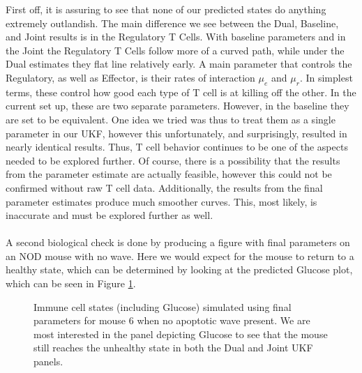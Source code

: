 \documentclass{article}
\begin{document}
First off, it is assuring to see that none of our predicted states do anything extremely outlandish. The main difference we see between the Dual, Baseline, and Joint results is in the Regulatory T Cells. With baseline parameters and in the Joint the Regulatory T Cells follow more of a curved path, while under the Dual estimates they flat line relatively early. A main parameter that controls the Regulatory, as well as Effector, is their rates of interaction $\mu_e$ and $\mu_r$. In simplest terms, these control how good each type of T cell is at killing off the other. In the current set up, these are two separate parameters. However, in the baseline they are set to be equivalent. One idea we tried was thus to treat them as a single parameter in our UKF, however this unfortunately, and surprisingly, resulted in nearly identical results. Thus, T cell behavior continues to be one of the aspects needed to be explored further. Of course, there is a possibility that the results from the parameter estimate are actually feasible, however this could not be confirmed without raw T cell data. Additionally, the results from the final parameter estimates produce much smoother curves. This, most likely, is inaccurate and must be explored further as well.\\
\\
A second biological check is done by producing a figure with final parameters on an NOD mouse with no wave. Here we would expect for the mouse to return to a healthy state, which can be determined by looking at the predicted Glucose plot, which can be seen in Figure \ref{fig:T1D_StatesNoWave}.\\


\begin{figure}[H]
    \centering
    \hfill
    \caption{Immune cell states (including Glucose) simulated using final parameters for mouse 6 when no apoptotic wave present. We are most interested in the panel depicting Glucose to see that the mouse still reaches the unhealthy state in both the Dual and Joint UKF panels.}
    \label{fig:T1D_StatesNoWave}
\end{figure}
\end{document}
